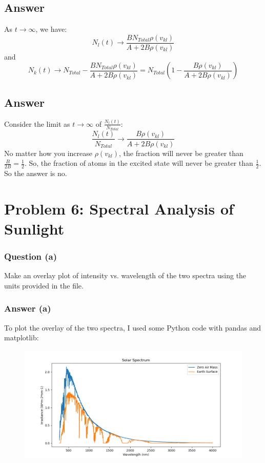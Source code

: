 \documentclass{article}
\begin{document}
\subsection{Answer}
As $t \rightarrow \infty$, we have:
\begin{equation}
    N_l(t) \rightarrow \frac{B N_{Total} \rho (v_{kl})}{A+2B\rho (v_{kl})}
\end{equation}
and
\begin{equation}
    N_k(t) \rightarrow N_{Total} - \frac{B N_{Total} \rho (v_{kl})}{A+2B\rho (v_{kl})} = N_{Total}\left(1-\frac{B \rho (v_{kl})}{A+2B\rho (v_{kl})}\right)
\end{equation}
\subsection{Answer}
Consider the limit as $t \rightarrow \infty$ of $\frac{N_l(t)}{N_{Total}}$:
\begin{equation}
    \frac{N_l(t)}{N_{Total}} \rightarrow \frac{B \rho (v_{kl})}{A+2B\rho (v_{kl})}
\end{equation}
No matter how you increase $\rho (v_{kl})$, the fraction will never be greater than $\frac{B}{2B} = \frac{1}{2}$. So, the fraction of atoms in the excited state will never be greater than $\frac{1}{2}$. So the answer is no.
\section{Problem 6: Spectral Analysis of Sunlight}

\subsubsection{Question (a)}
Make an overlay plot of intensity vs. wavelength of the two spectra using the units provided in the file.

\subsubsection{Answer (a)}
To plot the overlay of the two spectra, I used some Python code with pandas and matplotlib:
\begin{figure}[h]
    \centering
    \includegraphics[width=\textwidth]{solar_spectrum.png}
\end{figure}
\end{document}
